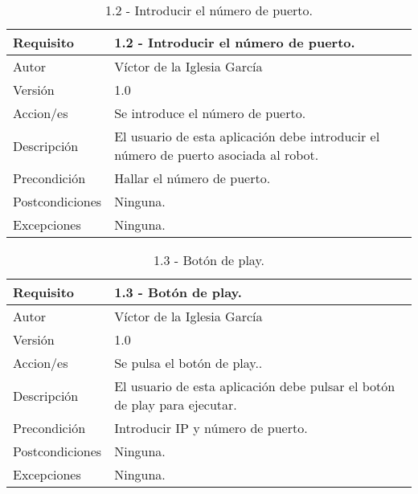 \begin{table}[h]
    \centering
    \begin{tabular}{| m{3cm} | m{8cm} |}
    \hline
        Requisito & 1.2 - Introducir el número de puerto.  \\ \hline
       Autor  &  Víctor de la Iglesia García \\ \hline
        Versión & 1.0 \\ \hline
        Accion/es & Se introduce el número de puerto. \\ \hline
         Descripción & El usuario de esta aplicación debe introducir el número de puerto asociada al robot. \\ \hline
        Precondición & Hallar el número de puerto. \\ \hline
        Postcondiciones & Ninguna. \\ \hline
        Excepciones & Ninguna. \\ \hline
    \end{tabular}
    \caption{1.2 - Introducir el número de puerto.}
    \label{1.2 - Introducir el número de puerto.}
\end{table}

\begin{table}[h]
    \centering
    \begin{tabular}{| m{3cm} | m{8cm} |}
    \hline
        Requisito & 1.3 - Botón de play.  \\ \hline
       Autor  &  Víctor de la Iglesia García \\ \hline
        Versión & 1.0 \\ \hline
        Accion/es & Se pulsa el botón de play.. \\ \hline
         Descripción & El usuario de esta aplicación debe pulsar el botón de play para ejecutar. \\ \hline
        Precondición & Introducir IP y número de puerto. \\ \hline
        Postcondiciones & Ninguna. \\ \hline
        Excepciones & Ninguna. \\ \hline
    \end{tabular}
    \caption{1.3 - Botón de play.}
    \label{1.3 - Botón de play.}
\end{table}

\newpage

